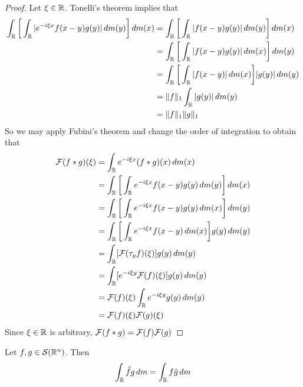 \documentclass{book}
\begin{document}
	\begin{proof}
		Let $\xi \in \mathbb{R}$. Tonelli's theorem implies that  
		\begin{align*}
			\int_{\mathbb{R}} \bigg[ \int_{\mathbb{R}} | e^{-i\xi x} f(x-y)g(y)| \, d m(y) \bigg] \, d m(x)
			& = \int_{\mathbb{R}}  \bigg[ \int_{\mathbb{R}}  |f(x-y)g(y) |\, d m(y) \bigg] \, d m(x) \\
			& = \int_{\mathbb{R}}  \bigg[ \int_{\mathbb{R}}  |f(x-y)g(y) |\, d m(x) \bigg] \, d m(y) \\
			& = \int_{\mathbb{R}}  \bigg[ \int_{\mathbb{R}}  |f(x-y) |\, d m(x) \bigg] |g(y)| \, d m(y) \\
			& = \|f\|_1 \int_{\mathbb{R}} |g(y)| \, d m(y) \\
			& = \|f\|_1\|g\|_1
		\end{align*}
		So we may apply Fubini's theorem and change the order of integration to obtain that
		\begin{align*}
			\mathcal{F}(f*g)(\xi)
			& = \int_{\mathbb{R}} e^{-i\xi x} (f*g)(x) \, d m(x) \\
			& = \int_{\mathbb{R}}  \bigg[ \int_{\mathbb{R}} e^{-i\xi x} f(x-y)g(y) \, d m(y) \bigg] \, d m(x) \\
			& = \int_{\mathbb{R}}  \bigg[ \int_{\mathbb{R}} e^{-i\xi x} f(x-y)g(y) \, d m(x) \bigg] \, d m(y) \\
			& = \int_{\mathbb{R}}  \bigg[ \int_{\mathbb{R}} e^{-i\xi x} f(x-y) \, d m(x) \bigg] g(y) \, d m(y) \\
			& = \int_{\mathbb{R}}  [\mathcal{F}(\tau_yf)(\xi) ] g(y) \, d m(y) \\
			& = \int_{\mathbb{R}}  [e^{-i \xi y}\mathcal{F}(f)(\xi) ] g(y) \, d m(y) \\
			& = \mathcal{F}(f)(\xi) \int_{\mathbb{R}}  e^{-i \xi y}  g(y) \, d m(y) \\
			& = \mathcal{F}(f)(\xi) \mathcal{F}(g)(\xi)
		\end{align*}
		Since $\xi \in \mathbb{R}$ is arbitrary, $\mathcal{F}(f*g) = \mathcal{F}(f) \mathcal{F}(g)$
	\end{proof}

	\begin{ex}
		Let $f,g \in \mathcal{S}(\mathbb{R}^n)$. Then $$\int_{\mathbb{R}}\hat{f} g \, d m = \int_{\mathbb{R}}f \hat{g}  \, d m$$
	\end{ex}
	
\end{document}

